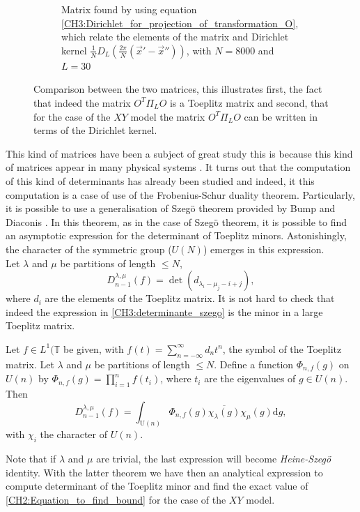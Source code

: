 \begin{figure}[H]
\begin{subfigure}[b]{0.48\textwidth}
        \caption{Matrix found by using equation \eqref{CH3:Dirichlet_for_projection_of_transformation_O}, which relate the elements of the matrix and Dirichlet kernel $\frac{1}{N} D_L\left(\frac{2\pi}{N}(\vec{x}'-\vec{x}'')\right)$, with $N=8000$ and $L=30$}
        \label{Matriz_dirichlet_approx}
    \end{subfigure}%
    \caption{Comparison between the two matrices, this illustrates first, the fact that indeed the matrix $O^{T}\Pi_L O$ is a Toeplitz matrix and second, that for the case of the $XY$ model the matrix $O^{T}\Pi_L O$ can be written in terms of the Dirichlet kernel.}
    \label{Matrices_comparison}
\end{figure}

This kind of matrices have been a subject of great study this is because this kind of matrices appear in many physical systems \cite{bottcher_introduction_1999,bump_lie_2013,noauthor_fisher-hartwig_nodate}. It turns out that the computation of this kind of determinants has already been studied and indeed, it this computation is a case of use of the Frobenius-Schur duality theorem\cite{bump_lie_2013}. Particularly, it is possible to use a generalisation of Szeg\"o theorem\cite{szego_grenzwertsatz_1915} provided by Bump and Diaconis \cite{bump_toeplitz_2002}. In this theorem, as in the case of Szeg\"o theorem, it is possible to find an asymptotic expression for the determinant of Toeplitz minors. Astonishingly, the character of the symmetric group ($U(N)$) emerges in this expression.\\
Let $\lambda$ and $\mu$ be partitions of length $\leq N$\cite{bump_lie_2013},
\begin{equation}
D^{\lambda,\mu}_{n-1}(f) = \operatorname{det} (d_{\lambda_i-\mu_j-i+j}) ,
\label{CH3:determinante_szego}
\end{equation}
where $d_i$ are the elements of the Toeplitz matrix. It is not hard to check that indeed the expression in \eqref{CH3:determinante_szego} is the minor in a large Toeplitz matrix\cite{bump_lie_2013}.
\begin{theorem}
Let $f\in L^{1}(\mathbb{T}$ be given, with $f(t)=\sum_{n=-\infty}^{\infty}d_nt^n$, the symbol of the Toeplitz matrix. Let $\lambda$ and $\mu$ be partitions of length $\leq N$. Define a function $\Phi_{n,f}(g)$ on $U(n)$ by $\Phi_{n,f}(g)=\prod_{i=1}^{n} f(t_i)$, where $t_i$ are the eigenvalues of $g\in U(n)$. Then
\begin{equation}
D_{n-1}^{\lambda, \mu}(f)=\int_{\mathrm{U}(n)} \Phi_{n, f}(g) \overline{\chi_{\lambda}(g)} \chi_{\mu}(g) \mathrm{d} g,
\end{equation}
with $\chi_{i}$ the character of $U(n)$\cite{bump_toeplitz_2002,bump_lie_2013}.
\end{theorem}
Note that if $\lambda$ and $\mu$ are trivial, the last expression will become \textit{Heine-Szeg\"o} identity.
With the latter theorem we have then an analytical expression to compute determinant of the Toeplitz minor and find the exact value of \eqref{CH2:Equation_to_find_bound} for the case of the $XY$ model.






